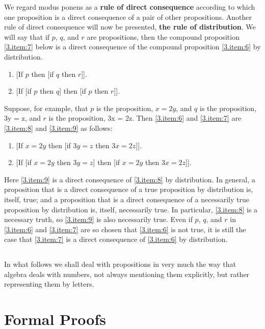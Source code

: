 \documentclass{book}
\let\oldmarginpar\marginpar
\renewcommand*{\marginpar}[1]{\oldmarginpar{\footnotesize#1}}
\begin{document}
We regard modus ponens as a \textbf{rule of direct consequence} according to which one proposition is a direct consequence of a pair of other propositions.  Another rule of direct consequence will now be presented, \textbf{the rule of distribution}.  We will say that if \(p\), \(q\), and \(r\) are propositions, then the compound proposition \ref{3.item:7} below is a direct consequence of the compound proposition \ref{3.item:6} by distribution.
\begin{enumerate}[resume*]
\item \label{3.item:6} [If \(p\) then [if \(q\) then \(r\)]].
\item \label{3.item:7} [If [if \(p\) then \(q\)] then [if \(p\) then \(r\)]].
\end{enumerate}
Suppose\marginpar{12}, for example, that \(p\) is the proposition, \(x = 2y\), and \(q\) is the proposition, 3y = z, and \(r\) is the proposition, 3x = 2z.  Then \ref{3.item:6} and \ref{3.item:7} are \ref{3.item:8} and \ref{3.item:9} as follows:
\begin{enumerate}[resume*]
\item \label{3.item:8} [If \(x = 2y\) then [if \(3y = z\) then \(3x = 2z\)]].
\item \label{3.item:9} [If [if \(x = 2y\) then \(3y = z\)] then [if \(x = 2y\) then \(3x = 2z\)]].
\end{enumerate}
Here \ref{3.item:9} is a direct consequence of \ref{3.item:8} by distribution.  In general, a proposition that is a direct consequence of a true proposition by distribution is, itself, true; and a proposition that is a direct consequence of a necessarily true proposition by distribution is, itself, necessarily true.  In particular, \ref{3.item:8} is a necessary truth, so \ref{3.item:9} is also necessarily true.  Even if \(p\), \(q\), and \(r\) in \ref{3.item:6} and \ref{3.item:7} are so chosen that \ref{3.item:6} is not true, it is still the case that \ref{3.item:7} is a direct consequence of \ref{3.item:6} by distribution.

\subsection{}
\label{sec:3.8}

In what follows we shall deal with propositions in very much the way that algebra deals with numbers, not always mentioning them explicitly, but rather representing them by letters.

\section{Formal Proofs}
\label{sec:4}
\end{document}
